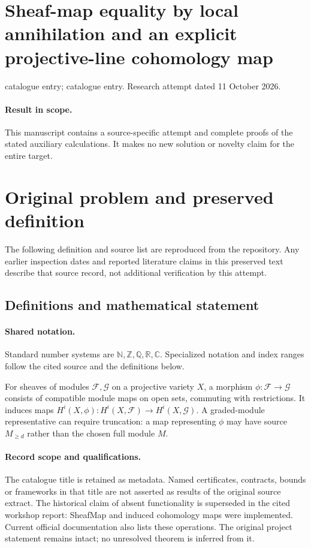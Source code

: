 \documentclass[11pt]{article}
\begin{document}
\section*{Sheaf-map equality by local annihilation and an explicit projective-line cohomology map}
\noindent catalogue entry; catalogue entry. Research attempt dated 11 October 2026.
\paragraph{Result in scope.}This manuscript contains a source-specific attempt and complete proofs of the stated auxiliary calculations. It makes no new solution or novelty claim for the entire target.
\section{Original problem and preserved definition}
The following definition and source list are reproduced from the repository. Any earlier inspection dates and reported literature claims in this preserved text describe that source record, not additional verification by this attempt.
\subsection{Definitions and mathematical statement}

\paragraph{Shared notation.}Standard number systems are $\mathbb N,\mathbb Z,\mathbb Q,\mathbb R,\mathbb C$. Specialized notation and index ranges follow the cited source and the definitions below.


For sheaves of modules $\mathcal F,\mathcal G$ on a projective variety $X$, a morphism $\phi:\mathcal F\to\mathcal G$ consists of compatible module maps on open sets, commuting with restrictions. It induces maps $H^i(X,\phi):H^i(X,\mathcal F)\to H^i(X,\mathcal G)$. A graded-module representative can require truncation: a map representing $\phi$ may have source $M_{\geq d}$ rather than the chosen full module $M$.
\paragraph{Record scope and qualifications.}
The catalogue title is retained as metadata. Named certificates, contracts, bounds or frameworks in that title are not asserted as results of the original source extract.
The historical claim of absent functionality is superseded in the cited workshop report: SheafMap and induced cohomology maps were implemented. Current official documentation also lists these operations. The original project statement remains intact; no unresolved theorem is inferred from it.
\end{document}
